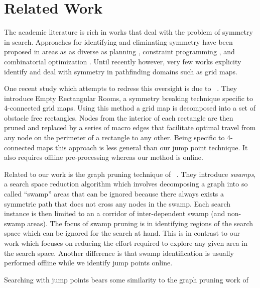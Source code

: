 \section{Related Work}
\label{sec:relatedwork}
The academic literature is rich in works that deal with the problem of symmetry
in search.  Approaches for identifying and eliminating symmetry have been
proposed in areas as as diverse as planning \cite{fox99}, constraint programming
\cite{gent00}, and combinatorial optimization \cite{fukunaga08}. Until recently
however, very few works explicity identify and deal with symmetry in pathfinding
domains such as grid maps.
\par
One recent study which attempts to redress this oversight is due to
\citeauthor{harabor10}~.  They introduce Empty Rectangular
Rooms, a symmetry breaking technique specific to 4-connected grid maps.  Using
this method a grid map is  decomposed into a set of obstacle free rectangles.
Nodes from the interior of each rectangle are then pruned and replaced by a
series of macro edges that facilitate optimal travel from any node on the
perimeter of a rectangle to any other.  Being specific to 4-connected maps this
approach is less general than our jump point technique. It also requires offline
pre-processing whereas our method is online.
\par
Related to our work is the graph pruning technique of
\citeauthor{pochter10}~.  They introduce \emph{swamps}, a
search space reduction algorithm which involves decomposing a graph into so
called ``swamp'' areas that can be ignored because there always exists a
symmetric path that does not cross any nodes in the swamp.  Each search instance
is then limited to an a corridor of inter-dependent swamp (and non-swamp areas).
The focus of swamp pruning is in identifying regions of
the search space which can be ignored for the search at hand.  This is in
contrast to our work which focuses on reducing the effort required to explore
any given area in the search space.  Another difference is that swamp
identification is usually performed offline while we identify jump points
online.
\par
Searching with jump points bears some similarity to the graph pruning work of
